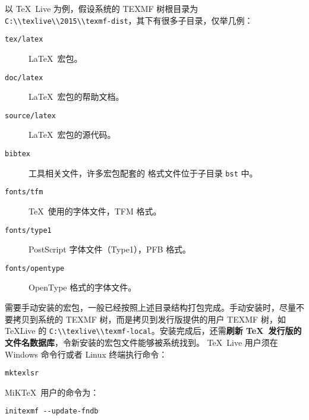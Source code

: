 以 \TeX\ Live 为例，假设系统的 TEXMF 树根目录为 \nolinkurl{C:\\texlive\\2015\\texmf-dist}，其下有很多子目录，仅举几例：
\begin{description}
  \item[\texttt{tex/latex}] \LaTeX\ 宏包。
  \item[\texttt{doc/latex}] \LaTeX\ 宏包的帮助文档。
  \item[\texttt{source/latex}] \LaTeX\ 宏包的源代码。
  \item[\texttt{bibtex}]  工具相关文件，许多宏包配套的  格式文件位于子目录 \texttt{bst} 中。
  \item[\texttt{fonts/tfm}] \TeX\ 使用的字体文件，TFM 格式。
  \item[\texttt{fonts/type1}] PostScript 字体文件（Type1），PFB 格式。
  \item[\texttt{fonts/opentype}] OpenType 格式的字体文件。
\end{description}

需要手动安装的宏包，一般已经按照上述目录结构打包完成。手动安装时，尽量不要拷贝到系统的 TEXMF 树，而是拷贝到发行版提供的用户 TEXMF 树，如
\TeX Live 的 \nolinkurl{C:\\texlive\\texmf-local}。安装完成后，还需\textbf{刷新 \TeX\ 发行版的文件名数据库}，令新安装的宏包文件能够被系统找到。
\TeX\ Live 用户须在 Windows 命令行或者 Linux 终端执行命令：
\begin{verbatim}
mktexlsr
\end{verbatim}
MiK\TeX\ 用户的命令为：
\begin{verbatim}
initexmf --update-fndb
\end{verbatim}

\endinput